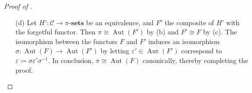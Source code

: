 \documentclass[10pt]{article}
\theoremstyle{thmstyle}
\theoremstyle{defstyle}
\newcommand{\sets}[1]{#1\text{-}\mathbf{sets}}
\newcommand{\Aut}{\operatorname{Aut}}
\newcommand{\scrC}{\mathscr{C}} %
\begin{document}
\begin{proof}[Proof of ]
\begin{enumerate}
Now given $(A, a), (B, b)\in J_0$ and $g: A\to B$ a morphism, there exists a unique $\beta\in\Aut_{\scrC}(B)$ such that $F(\beta)(F(g)(a)) = b$. Then $f \coloneq \beta g$ satisfies $F(f)(a) = b$, so $(A, a)\geqq_f (B, b)$ in $J_0$, and this happens if and only if $(A, a')\geqq_{f'} (B, b')$ in $J_0'$ but the morphisms $f, f': A\to B$ are not necessarily the same. 

But it is true that for all $\alpha\in\Aut_{\scrC}(A)$, there exists a $\gamma\in\Aut_{\scrC}(B)$ making the following diagram commute: 
\begin{equation*}
    \xymatrix {
        A\ar[r]^f\ar[d]_{\alpha} & B\ar[d]^\gamma\\
        A\ar[r]_{f'} & B
    }
\end{equation*}
Now mapping $\alpha\mapsto\gamma$ we obtain a system of morphisms between the finite non-empty groups $\Aut_{\scrC}(A)$ giving rise to a projective sstem. Thsi limit is non-empty. This implies that we can make a simultaneous choice $(\alpha_A)_{(A, a)\in J_0}$ such that all the diagrams commute. This induces an isomorphism 
\begin{equation*}
    \varinjlim_{J_0}\scrC(A, -)\cong\varinjlim_{J_0'}\scrC(A, -),
\end{equation*}
so that $F\cong F'$.

\item[(d)] Let $H': \scrC\to\sets{\pi}$ be an equivalence, and $F'$ the composite of $H'$ with the forgetful functor. Then $\pi\cong\Aut(F')$ by (b) and $F'\cong F$ by (c). The isomorphism between the functors $F$ and $F'$ induces an isomorphism $\sigma:\Aut(F)\to\Aut(F')$ by letting $\varepsilon'\in\Aut(F')$ correspond to $\varepsilon\coloneq\sigma\varepsilon'\sigma^{-1}$. In conclusion, $\pi\cong\Aut(F)$ canonically, thereby completing the proof. \qedhere
\end{enumerate}
\end{proof}
\end{document}
